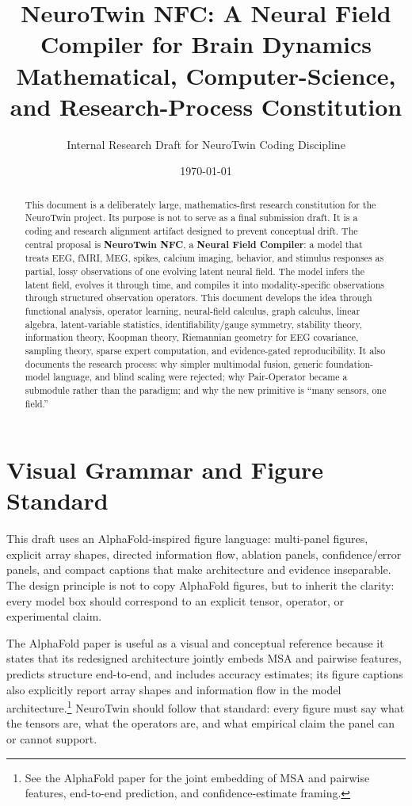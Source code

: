 \documentclass[11pt]{article}
\title{\Huge NeuroTwin NFC: A Neural Field Compiler for Brain Dynamics\\[0.5em]
\Large Mathematical, Computer-Science, and Research-Process Constitution}
\author{Internal Research Draft for NeuroTwin Coding Discipline}
\date{\today}
\begin{document}
\maketitle

\begin{abstract}
This document is a deliberately large, mathematics-first research constitution for the NeuroTwin project. Its purpose is not to serve as a final submission draft. It is a coding and research alignment artifact designed to prevent conceptual drift. The central proposal is \textbf{NeuroTwin NFC}, a \textbf{Neural Field Compiler}: a model that treats EEG, fMRI, MEG, spikes, calcium imaging, behavior, and stimulus responses as partial, lossy observations of one evolving latent neural field. The model infers the latent field, evolves it through time, and compiles it into modality-specific observations through structured observation operators. This document develops the idea through functional analysis, operator learning, neural-field calculus, graph calculus, linear algebra, latent-variable statistics, identifiability/gauge symmetry, stability theory, information theory, Koopman theory, Riemannian geometry for EEG covariance, sampling theory, sparse expert computation, and evidence-gated reproducibility. It also documents the research process: why simpler multimodal fusion, generic foundation-model language, and blind scaling were rejected; why Pair-Operator became a submodule rather than the paradigm; and why the new primitive is ``many sensors, one field.''
\end{abstract}

\tableofcontents
\newpage

\section{Visual Grammar and Figure Standard}

This draft uses an AlphaFold-inspired figure language: multi-panel figures, explicit array shapes, directed information flow, ablation panels, confidence/error panels, and compact captions that make architecture and evidence inseparable. The design principle is not to copy AlphaFold figures, but to inherit the clarity: every model box should correspond to an explicit tensor, operator, or experimental claim.

The AlphaFold paper is useful as a visual and conceptual reference because it states that its redesigned architecture jointly embeds MSA and pairwise features, predicts structure end-to-end, and includes accuracy estimates; its figure captions also explicitly report array shapes and information flow in the model architecture.\footnote{See the AlphaFold paper for the joint embedding of MSA and pairwise features, end-to-end prediction, and confidence-estimate framing.} NeuroTwin should follow that standard: every figure must say what the tensors are, what the operators are, and what empirical claim the panel can or cannot support.
\end{document}
